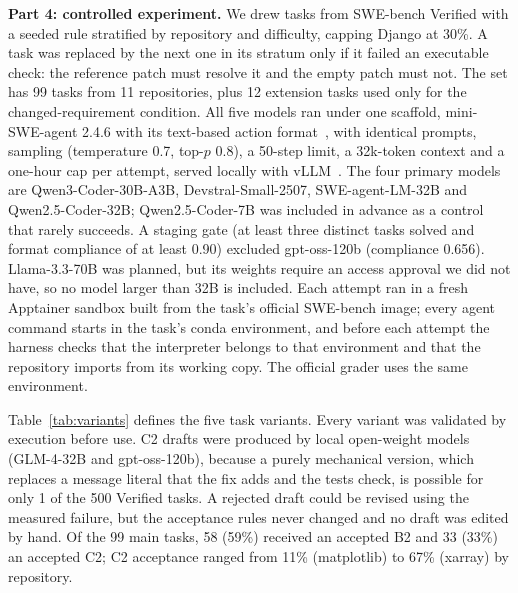 \documentclass[conference]{IEEEtran}
\begin{document}
\textbf{Part 4: controlled experiment.} We drew tasks from SWE-bench Verified with a seeded rule stratified by repository and difficulty, capping Django at 30\%. A task was replaced by the next one in its stratum only if it failed an executable check: the reference patch must resolve it and the empty patch must not. The set has 99 tasks from 11 repositories, plus 12 extension tasks used only for the changed-requirement condition. All five models ran under one scaffold, mini-SWE-agent 2.4.6 with its text-based action format~\cite{minisweagent}, with identical prompts, sampling (temperature 0.7, top-$p$ 0.8), a 50-step limit, a 32k-token context and a one-hour cap per attempt, served locally with vLLM~\cite{kwon2023vllm}. The four primary models are Qwen3-Coder-30B-A3B, Devstral-Small-2507, SWE-agent-LM-32B and Qwen2.5-Coder-32B; Qwen2.5-Coder-7B was included in advance as a control that rarely succeeds. A staging gate (at least three distinct tasks solved and format compliance of at least 0.90) excluded gpt-oss-120b (compliance 0.656). Llama-3.3-70B was planned, but its weights require an access approval we did not have, so no model larger than 32B is included. Each attempt ran in a fresh Apptainer sandbox built from the task's official SWE-bench image; every agent command starts in the task's conda environment, and before each attempt the harness checks that the interpreter belongs to that environment and that the repository imports from its working copy. The official grader uses the same environment.

Table~\ref{tab:variants} defines the five task variants. Every variant was validated by execution before use. C2 drafts were produced by local open-weight models (GLM-4-32B and gpt-oss-120b), because a purely mechanical version, which replaces a message literal that the fix adds and the tests check, is possible for only 1 of the 500 Verified tasks. A rejected draft could be revised using the measured failure, but the acceptance rules never changed and no draft was edited by hand. Of the 99 main tasks, 58 (59\%) received an accepted B2 and 33 (33\%) an accepted C2; C2 acceptance ranged from 11\% (matplotlib) to 67\% (xarray) by repository.
\end{document}
